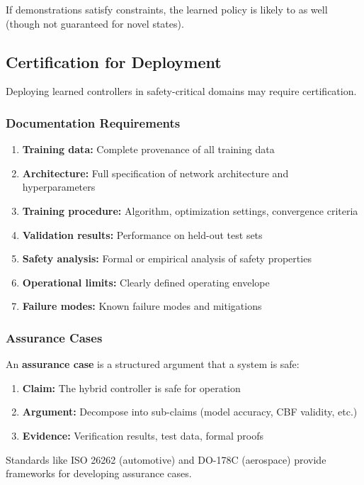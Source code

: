 If demonstrations satisfy constraints, the learned policy is likely to as well (though not guaranteed for novel states).

\subsection{Certification for Deployment}

Deploying learned controllers in safety-critical domains may require certification.

\subsubsection{Documentation Requirements}

\begin{enumerate}
    \item \textbf{Training data:} Complete provenance of all training data
    \item \textbf{Architecture:} Full specification of network architecture and hyperparameters
    \item \textbf{Training procedure:} Algorithm, optimization settings, convergence criteria
    \item \textbf{Validation results:} Performance on held-out test sets
    \item \textbf{Safety analysis:} Formal or empirical analysis of safety properties
    \item \textbf{Operational limits:} Clearly defined operating envelope
    \item \textbf{Failure modes:} Known failure modes and mitigations
\end{enumerate}

\subsubsection{Assurance Cases}

An \textbf{assurance case} is a structured argument that a system is safe:
\begin{enumerate}
    \item \textbf{Claim:} The hybrid controller is safe for operation
    \item \textbf{Argument:} Decompose into sub-claims (model accuracy, CBF validity, etc.)
    \item \textbf{Evidence:} Verification results, test data, formal proofs
\end{enumerate}

Standards like ISO 26262 (automotive) and DO-178C (aerospace) provide frameworks for developing assurance cases.

